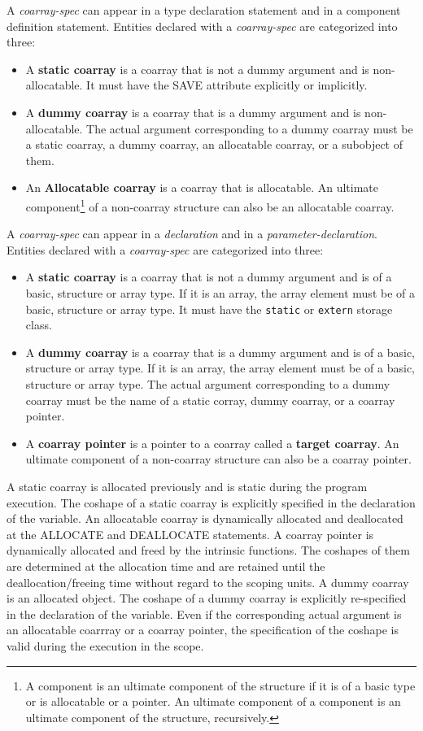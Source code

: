 {\onlyF} A {\it coarray-spec} can appear in a type declaration statement 
and in a component definition statement.
Entities declared with a {\it coarray-spec} are categorized into three:
\begin{itemize}
\item A {\bf static coarray} is a coarray that is not a dummy argument and is
non-allocatable. 
It must have the SAVE attribute explicitly or implicitly.
\item A {\bf dummy coarray} is a coarray that is a dummy argument and is 
non-allocatable.
The actual argument corresponding to a dummy coarray must be a static coarray,
a dummy coarray, an allocatable coarray, or a subobject of them.
\item An {\bf Allocatable coarray} is a coarray that is allocatable.
An ultimate component\footnote
{A component is an ultimate component of the structure if it is of 
a basic type or is allocatable or a pointer.
An ultimate component of a component is an ultimate component of the structure,
recursively.}
of a non-coarray structure can also be an allocatable coarray.
\end{itemize}

{\onlyC} A {\it coarray-spec} can appear in a {\it declaration} and 
in a {\it parameter-declaration}. 
Entities declared with a {\it coarray-spec} are categorized into three:
\begin{itemize}
\item A {\bf static coarray} is a coarray that is not a dummy argument and
is of a basic, structure or array type. If it is an array, the array 
element must be of a basic, structure or array type.
It must have the {\tt static} or {\tt extern} storage class.
\item A {\bf dummy coarray} is a coarray that is a dummy argument and
is of a basic, structure or array type. If it is an array, the array 
element must be of a basic, structure or array type.
The actual argument corresponding to a dummy coarray must be the name
of a static corray, dummy coarray, or a coarray pointer.
\item A {\bf coarray pointer} is a pointer to a coarray called a 
{\bf target coarray}.
An ultimate component of a non-coarray structure can also be a
coarray pointer.
\end{itemize}

A static coarray is allocated previously and is static during the program 
execution. 
The coshape of a static coarray is explicitly specified in the declaration of the 
variable.
%
An allocatable coarray is dynamically allocated and deallocated at
the ALLOCATE and DEALLOCATE statements. 
A coarray pointer is dynamically allocated and freed by the intrinsic 
functions. 
The coshapes of them are determined at the allocation time and are retained 
until the deallocation/freeing time without regard to the scoping units.
%
A dummy coarray is an allocated object. 
The coshape of a dummy coarray is explicitly re-specified in the declaration of the
variable. Even if the corresponding actual argument is an allocatable coarrray or
a coarray pointer, the specification of the coshape is valid during the execution
in the scope.
%


